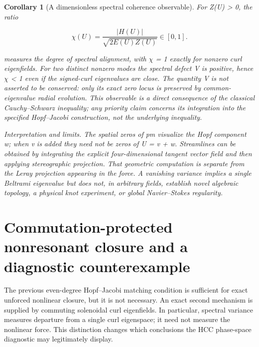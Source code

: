 \documentclass[10pt,letterpaper]{article}
\newtheorem{corollary}[theorem]{Corollary}
\theoremstyle{remark}
\begin{document}
\begin{corollary}[A dimensionless spectral coherence observable]

For Z(U) > 0, the ratio


\begin{equation}
\tag{50}\label{eq:50}
\chi(U)=\frac{|H(U)|}{\sqrt{2E(U)Z(U)}}\in[0,1].
\end{equation}

measures the degree of spectral alignment, with \(\chi \) = 1 exactly for nonzero curl eigenfields. For two distinct nonzero modes the spectral defect V is positive, hence \(\chi \) < 1 even if the signed-curl eigenvalues are close. The quantity V is not asserted to be conserved: only its exact zero locus is preserved by common- eigenvalue radial evolution. This observable is a direct consequence of the classical Cauchy–Schwarz inequality; any priority claim concerns its integration into the specified Hopf–Jacobi construction, not the underlying inequality.


Interpretation and limits. The spatial zeros of pm visualize the Hopf component w; when v is added they need not be zeros of U = v + w. Streamlines can be obtained by integrating the explicit four-dimensional tangent vector field and then applying stereographic projection. That geometric computation is separate from the Leray projection appearing in the force. A vanishing variance implies a single Beltrami eigenvalue but does not, in arbitrary fields, establish novel algebraic topology, a physical knot experiment, or global Navier–Stokes regularity.


\end{corollary}

\section{Commutation-protected nonresonant closure and a diagnostic counterexample}


The previous even-degree Hopf–Jacobi matching condition is sufficient for exact unforced nonlinear closure, but it is not necessary. An exact second mechanism is supplied by commuting solenoidal curl eigenfields. In particular, spectral variance measures departure from a single curl eigenspace; it need not measure the nonlinear force. This distinction changes which conclusions the HCC phase-space diagnostic may legitimately display.
\end{document}
